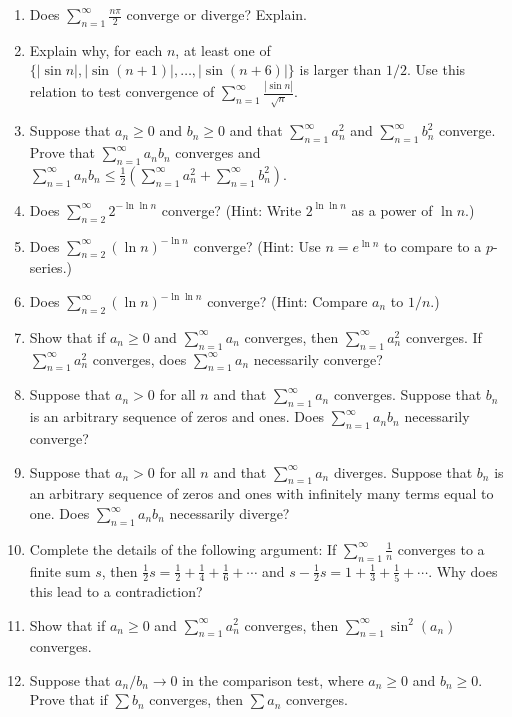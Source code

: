 \documentclass{exercises}
\begin{document}
\begin{enumerate}[resume]
\item Does $\sum_{n=1}^{\infty}\frac{n\pi}{2}$ converge or diverge? Explain.
\item Explain why, for each $n$, at least one of $\{|\sin n|,|\sin(n+1)|,\ldots,|\sin(n+6)|\}$ is larger than $1/2$. Use this relation to test convergence of $\sum_{n=1}^{\infty}\frac{|\sin n|}{\sqrt{n}}$.
\item Suppose that $a_{n}\ge 0$ and $b_{n}\ge 0$ and that $\sum_{n=1}^{\infty}a_{n}^{2}$ and $\sum_{n=1}^{\infty}b_{n}^{2}$ converge. Prove that $\sum_{n=1}^{\infty}a_{n}b_{n}$ converges and $\sum_{n=1}^{\infty}a_{n}b_{n}\le \frac{1}{2}\left(\sum_{n=1}^{\infty}a_{n}^{2}+\sum_{n=1}^{\infty}b_{n}^{2}\right)$.
\item Does $\sum_{n=2}^{\infty}2^{-\ln \ln n}$ converge? (Hint: Write $2^{\ln \ln n}$ as a power of $\ln n$.)
\item Does $\sum_{n=2}^{\infty}(\ln n)^{-\ln n}$ converge? (Hint: Use $n=e^{\ln n}$ to compare to a $p$-series.)
\item Does $\sum_{n=2}^{\infty}(\ln n)^{-\ln \ln n}$ converge? (Hint: Compare $a_{n}$ to $1/n$.)
\item Show that if $a_{n}\ge 0$ and $\sum_{n=1}^{\infty}a_{n}$ converges, then $\sum_{n=1}^{\infty}a_{n}^{2}$ converges. If $\sum_{n=1}^{\infty}a_{n}^{2}$ converges, does $\sum_{n=1}^{\infty}a_{n}$ necessarily converge?
\item Suppose that $a_{n}>0$ for all $n$ and that $\sum_{n=1}^{\infty}a_{n}$ converges. Suppose that $b_{n}$ is an arbitrary sequence of zeros and ones. Does $\sum_{n=1}^{\infty}a_{n}b_{n}$ necessarily converge?
\item Suppose that $a_{n}>0$ for all $n$ and that $\sum_{n=1}^{\infty}a_{n}$ diverges. Suppose that $b_{n}$ is an arbitrary sequence of zeros and ones with infinitely many terms equal to one. Does $\sum_{n=1}^{\infty}a_{n}b_{n}$ necessarily diverge?
\item Complete the details of the following argument: If $\sum_{n=1}^{\infty}\frac{1}{n}$ converges to a finite sum $s$, then $\frac{1}{2}s=\frac{1}{2}+\frac{1}{4}+\frac{1}{6}+\cdots$ and $s-\frac{1}{2}s=1+\frac{1}{3}+\frac{1}{5}+\cdots$. Why does this lead to a contradiction?
\item Show that if $a_{n}\ge 0$ and $\sum_{n=1}^{\infty}a_{n}^{2}$ converges, then $\sum_{n=1}^{\infty}\sin^{2}(a_{n})$ converges.
\item Suppose that $a_{n}/b_{n}\to 0$ in the comparison test, where $a_{n}\ge 0$ and $b_{n}\ge 0$. Prove that if $\sum b_{n}$ converges, then $\sum a_{n}$ converges.

\end{enumerate}
\end{document}
